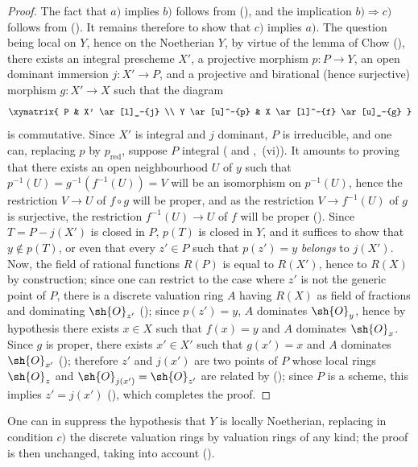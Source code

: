 \begin{proof}
The fact that $a)$ implies $b)$ follows from (), and the implication $b)\Rightarrow c)$ follows from ().
It remains therefore to show that $c)$ implies $a)$.
The question being local on $Y$, hence on the Noetherian $Y$, by virtue of the lemma of Chow (), there exists an integral prescheme $X'$, a projective morphism $p:P\to Y$, an open dominant immersion $j:X'\to P$, and a projective and birational (hence surjective) morphism $g:X'\to X$ such that the diagram
\[
  \xymatrix{
    P & X' \ar[l]_-{j} \\
    Y \ar[u]^-{p} & X \ar[l]^-{f} \ar[u]_-{g}
  }
\]
is commutative.
Since $X'$ is integral and $j$ dominant, $P$ is irreducible, and one can, replacing $p$ by $p_\mathrm{red}$, suppose $P$ integral ( and ,~(vi)).
It amounts to proving that there exists an open neighbourhood $U$ of $y$ such that $p^{-1}(U)=g^{-1}(f^{-1}(U))=V$ will be an isomorphism on $p^{-1}(U)$, hence the restriction $V\to U$ of $f\circ g$ will be proper, and as the restriction $V\to f^{-1}(U)$ of $g$ is surjective, the restriction $f^{-1}(U)\to U$ of $f$ will be proper ().
Since $T=P-j(X')$ is closed in $P$, $p(T)$ is closed in $Y$, and it suffices to show that $y\notin p(T)$, or even that every $z'\in P$ such that $p(z')=y$ \emph{belongs} to $j(X')$.
Now, the field of rational functions $R(P)$ is equal to $R(X')$, hence to $R(X)$ by construction; since one can restrict to the case where $z'$ is not the generic point of $P$, there is a discrete valuation ring $A$ having $R(X)$ as field of fractions and dominating $\sh{O}_{z'}$ (); since $p(z')=y$, $A$ dominates $\sh{O}_y$, hence by hypothesis there exists $x\in X$ such that $f(x)=y$ and $A$ dominates $\sh{O}_x$.
Since $g$ is proper, there exists $x'\in X'$ such that $g(x')=x$ and $A$ dominates $\sh{O}_{x'}$ (); therefore $z'$ and $j(x')$ are two points of $P$ whose local rings $\sh{O}_z$ and $\sh{O}_{j(x')}=\sh{O}_{z'}$ are related by (); since $P$ is a scheme, this implies $z'=j(x')$ (), which completes the proof.
\end{proof}

\begin{remarks}[15.7.3]
\label{IV.15.7.3}
One can in  suppress the hypothesis that $Y$ is locally Noetherian, replacing in condition $c)$ the discrete valuation rings by valuation rings of any kind; the proof is then unchanged, taking into account ().
\end{remarks}

